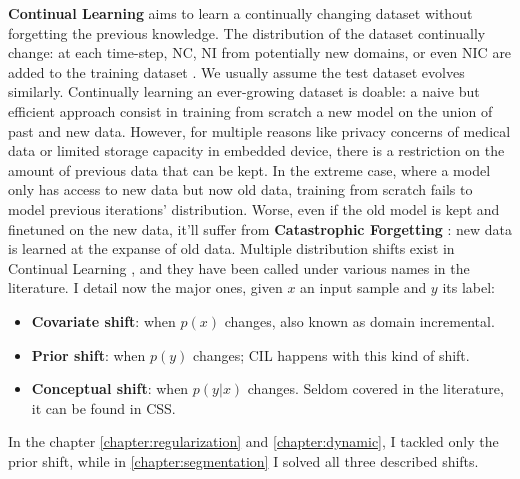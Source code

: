 \textbf{Continual Learning} aims to learn a continually changing dataset without forgetting the
previous knowledge. The distribution of the dataset continually change: at each time-step, \ac{NC},
\ac{NI} from potentially new domains, or even \ac{NIC} are added to the training dataset
\cite{lomonaco2017core50}. We usually assume the test dataset evolves similarly. Continually
learning an ever-growing dataset is doable: a naive but efficient approach consist in training from
scratch a new model on the union of past and new data. However, for multiple reasons like privacy
concerns of medical data or limited storage capacity in embedded device, there is a restriction on
the amount of previous data that can be kept. In the extreme case, where a model only has access to
new data but now old data, training from scratch fails to model previous iterations' distribution.
Worse, even if the old model is kept and finetuned on the new data, it'll suffer from
\textbf{Catastrophic Forgetting} \citep{robins1995catastrophicforgetting}: new data is learned at
the expanse of old data. Multiple distribution shifts exist in Continual Learning
\citep{morenotorresa2012datasetshift,lesort2021driftanalysis}, and they have been called under various names in the
literature. I detail now the major ones, given $x$ an input sample and $y$ its label:

\begin{itemize}
    \item \textbf{Covariate shift}: when $p(x)$ changes, also known as domain incremental.
    \item \textbf{Prior shift}: when $p(y)$ changes; \ac{CIL} happens with this kind of shift.
    \item \textbf{Conceptual shift}: when $p(y | x)$ changes. Seldom covered in the literature, it
          can be found in \acf{CSS}.
\end{itemize}

In the chapter \autoref{chapter:regularization} and \autoref{chapter:dynamic}, I tackled only the
prior shift, while in \autoref{chapter:segmentation} I solved all three described shifts.


